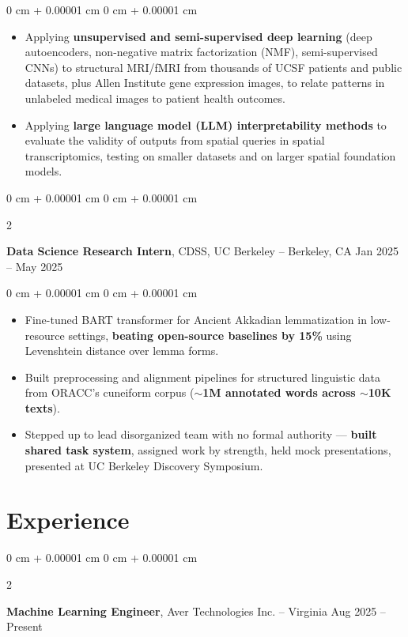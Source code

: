 \documentclass[10pt, letterpaper]{article}
\newenvironment{highlights}{
    \begin{itemize}[
        topsep=0.3 cm,
        parsep=0.06 cm,
        partopsep=0pt,
        itemsep=0.02 cm,
        leftmargin=0 cm + 10pt
    ]
}{
    \end{itemize}
} %
\newenvironment{onecolentry}{
    \begin{adjustwidth}{
        0 cm + 0.00001 cm
    }{
        0 cm + 0.00001 cm
    }
}{
    \end{adjustwidth}
} %
\newenvironment{twocolentry}[2][]{
    \onecolentry
    \def\secondColumn{#2}
    \setcolumnwidth{\fill, 4.5 cm}
    \begin{paracol}{2}
}{
    \switchcolumn \raggedleft \secondColumn
    \end{paracol}
    \endonecolentry
} %
\begin{document}
        \vspace{0.075 cm}
        \begin{onecolentry}
            \begin{highlights}
                \item Applying \textbf{unsupervised and semi-supervised deep learning} (deep autoencoders, non-negative matrix factorization (NMF), semi-supervised CNNs) to structural MRI/fMRI from thousands of UCSF patients and public datasets, plus Allen Institute gene expression images, to relate patterns in unlabeled medical images to patient health outcomes.
                \item Applying \textbf{large language model (LLM) interpretability methods} to evaluate the validity of outputs from spatial queries in spatial transcriptomics, testing on smaller datasets and on larger spatial foundation models.
            \end{highlights}
        \end{onecolentry}

        \vspace{0.075 cm}

        \begin{twocolentry}{
            Jan 2025 – May 2025
        }
            \textbf{Data Science Research Intern}, CDSS, UC Berkeley -- Berkeley, CA\end{twocolentry}

        \vspace{0.075 cm}
        \begin{onecolentry}
            \begin{highlights}
                \item Fine-tuned BART transformer for Ancient Akkadian lemmatization in low-resource settings, \textbf{beating open-source baselines by 15\%} using Levenshtein distance over lemma forms.
                \item Built preprocessing and alignment pipelines for structured linguistic data from ORACC's cuneiform corpus (\textbf{$\sim$1M annotated words across $\sim$10K texts}).
                \item Stepped up to lead disorganized team with no formal authority — \textbf{built shared task system}, assigned work by strength, held mock presentations, presented at UC Berkeley Discovery Symposium.
            \end{highlights}
       \end{onecolentry}

    \section{Experience}
        \begin{twocolentry}{
            Aug 2025 – Present
        }
            \textbf{Machine Learning Engineer}, Aver Technologies Inc. -- Virginia\end{twocolentry}
\end{document}
